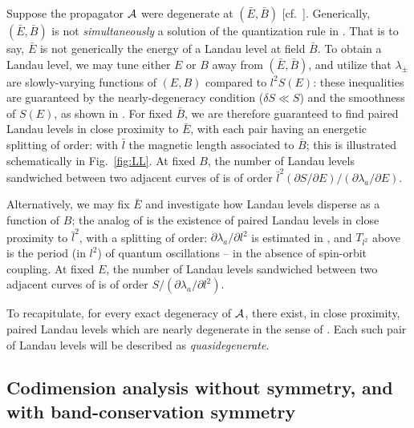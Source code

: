 \documentclass[aps, showpacs, twocolumn, notitlepage, superscriptaddress]{revtex4-1}
\begin{document}
Suppose the propagator ${\cal A}$ were degenerate at $(\bar{E},\bar{B})$ [cf.\ ]. Generically, $(\bar{E},\bar{B})$ is not \emph{simultaneously} a solution of the quantization rule in .  
That is to say, $\bar{E}$ is not generically the energy of a Landau level at field $\bar{B}$. To obtain a Landau level, we may tune either $E$ or $B$   away from $(\bar{E},\bar{B})$, and  utilize that  $\lambda_{\pm}$ are slowly-varying functions of $(E,B)$ compared to $l^2S(E)$:
these inequalities are guaranteed by the nearly-degeneracy condition ($\delta S{\ll}S$) and the smoothness of $S(E)$, as shown in .  For fixed $\bar{B}$, we are therefore guaranteed to find paired Landau levels  in close proximity to $\bar{E}$, with each pair having an energetic splitting of order:
with $\bar{l}$ the magnetic length associated to $\bar{B}$; this is illustrated schematically in Fig.\ \ref{fig:LL}. At fixed $B$, the number of Landau levels sandwiched between two adjacent curves of  is of order $\bar{l}^2(\partial S/\partial E)/(\partial \lambda_a/\partial E).$


Alternatively, we may fix $\bar{E}$ and investigate how Landau levels disperse as a function of $B$; the analog of   is the existence of paired Landau levels in close proximity to $\bar{l}^2$, with a splitting of order:
$\partial \lambda_a/\partial l^2$ is estimated in , and
$T_{l^2}$ above is the period (in $l^2$) of quantum oscillations -- in the absence of spin-orbit coupling. At fixed $E$, the number of Landau levels sandwiched between two adjacent curves of  is of order $S/(\partial \lambda_a/\partial l^2).$

To recapitulate, for every exact degeneracy of ${\cal A}$, there exist, in close proximity, paired Landau levels which are  nearly degenerate in the sense of . Each such pair of Landau levels will be described as \textit{quasidegenerate}. 

\subsection{Codimension analysis without symmetry, and with band-conservation symmetry}\label{sec:introducecodimension}
\end{document}
